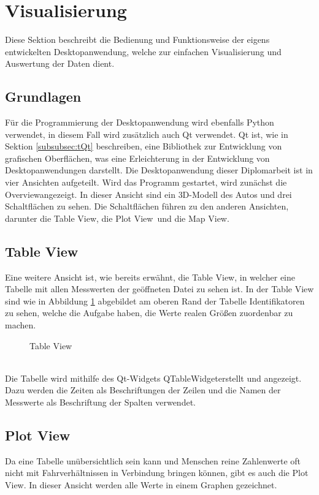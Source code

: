\section{Visualisierung}
\label{sec:DesktopApp}
Diese Sektion beschreibt die Bedienung und Funktionsweise der eigens entwickelten Desktopanwendung, welche zur einfachen Visualisierung und Auswertung der Daten dient.
\subsection{Grundlagen}
\label{subsec:VisGrundlagen}
Für die Programmierung der Desktopanwendung wird ebenfalls Python verwendet, in diesem Fall wird zusätzlich auch Qt verwendet. Qt ist, wie in Sektion \ref{subsubsec:tQt} beschreiben, eine Bibliothek zur Entwicklung von grafischen Oberflächen, was eine Erleichterung in der Entwicklung von Desktopanwendungen darstellt. Die Desktopanwendung dieser Diplomarbeit ist in vier Ansichten aufgeteilt. Wird das Programm gestartet, wird zunächst die \glqq Overview\grqq angezeigt. In dieser Ansicht sind ein \ac{3D}-Modell des Autos und drei Schaltflächen zu sehen. Die Schaltflächen führen zu den anderen Ansichten, darunter die \glqq Table View\grqq , die \glqq Plot View\grqq \ und die \glqq Map View\grqq .
\subsection{Table View}
\label{subsec:VisTableView}
Eine weitere Ansicht ist, wie bereits erwähnt, die \glqq Table View\grqq , in welcher eine Tabelle mit allen Messwerten der geöffneten Datei zu sehen ist. In der Table View sind wie in Abbildung \ref{fig:TableView} abgebildet am oberen Rand der Tabelle Identifikatoren zu sehen, welche die Aufgabe haben, die Werte realen Größen zuordenbar zu machen.
\begin{figure}[h]
\centering
\missingfigure{}
\caption{Table View}
\label{fig:TableView}
\end{figure}
\\
Die Tabelle wird mithilfe des Qt-Widgets \glqq QTableWidget\grqq erstellt und angezeigt. Dazu werden die Zeiten als Beschriftungen der Zeilen und die Namen der Messwerte als Beschriftung der Spalten verwendet. 

\subsection{Plot View}
\label{subsec:VisPlotView}
Da eine Tabelle unübersichtlich sein kann und Menschen reine Zahlenwerte oft nicht mit Fahrverhältnissen in Verbindung bringen können, gibt es auch die \glqq Plot View\grqq . In dieser Ansicht werden alle Werte in einem Graphen gezeichnet.
